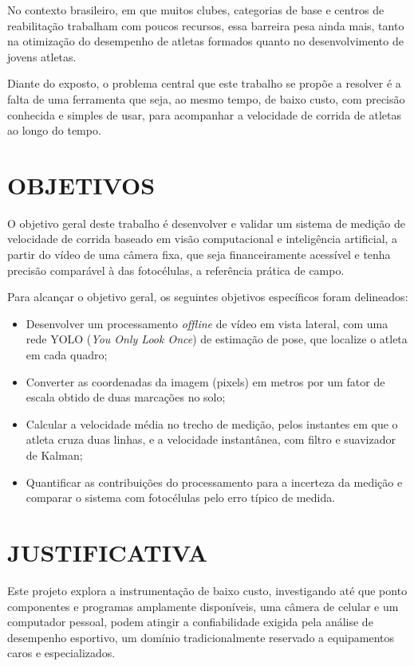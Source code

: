 \documentclass[
    12pt,               %
    openright,          %
    twoside,            %
    a4paper,            %
    chapter=TITLE,      %
    english,            %
    brazil              %
    ]{abntex2}
\begin{document}
No contexto brasileiro, em que muitos clubes, categorias de base e centros de reabilitação trabalham com poucos recursos, essa barreira pesa ainda mais, tanto na otimização do desempenho de atletas formados quanto no desenvolvimento de jovens atletas.

Diante do exposto, o problema central que este trabalho se propõe a resolver é a falta de uma ferramenta que seja, ao mesmo tempo, de baixo custo, com precisão conhecida e simples de usar, para acompanhar a velocidade de corrida de atletas ao longo do tempo.

\section{OBJETIVOS}

O objetivo geral deste trabalho é desenvolver e validar um sistema de medição de velocidade de corrida baseado em visão computacional e inteligência artificial, a partir do vídeo de uma câmera fixa, que seja financeiramente acessível e tenha precisão comparável à das fotocélulas, a referência prática de campo.

Para alcançar o objetivo geral, os seguintes objetivos específicos foram delineados:
\begin{itemize}
    \item Desenvolver um processamento \textit{offline} de vídeo em vista lateral, com uma rede YOLO (\textit{You Only Look Once}) de estimação de pose, que localize o atleta em cada quadro;
    \item Converter as coordenadas da imagem (pixels) em metros por um fator de escala obtido de duas marcações no solo;
    \item Calcular a velocidade média no trecho de medição, pelos instantes em que o atleta cruza duas linhas, e a velocidade instantânea, com filtro e suavizador de Kalman;
    \item Quantificar as contribuições do processamento para a incerteza da medição e comparar o sistema com fotocélulas pelo erro típico de medida.
\end{itemize}

\section{JUSTIFICATIVA}

Este projeto explora a instrumentação de baixo custo, investigando até que ponto componentes e programas amplamente disponíveis, uma câmera de celular e um computador pessoal, podem atingir a confiabilidade exigida pela análise de desempenho esportivo, um domínio tradicionalmente reservado a equipamentos caros e especializados.
\end{document}
